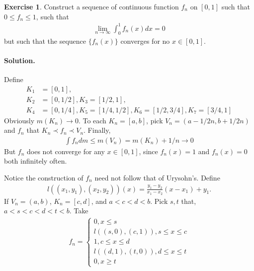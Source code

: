 \documentclass[10pt,a4paper]{book}
\theoremstyle{definition}
\newtheorem{exercise}{Exercise}[chapter]
\begin{document}
	\begin{exercise}
		Construct a sequence of continuous function $ f_n $ on $ [0, 1] $ such that $ 0 \le f_n \le 1 $, such that
		\begin{align*}
			\lim _{n \to \infty} \int_0^1 f_n(x) dx = 0
		\end{align*}
		but such that the sequence $ \{f_n(x)\} $ converges for no $ x \in [0, 1] $.

		\paragraph{Solution. }
		Define
		\begin{align*}
			K_1 &= [0, 1], \\
			K_2 &= [0, 1/2], K_3 = [1/2, 1], \\
			K_4 &= [0, 1/4], K_5 = [1/4, 1/2], K_6 = [1/2, 3/4], K_7 = [3/4, 1]
		\end{align*}
		Obviously $ m(K_n) \to 0 $. To each $ K_n = [a, b] $, pick $ V_n = (a - 1/2n, b + 1/2n) $ and $ f_n $ that $ K_n \prec f_n \prec V_n $. Finally,
		\begin{align*}
			\int f_n dm \le m(V_n) = m(K_n) + 1/n \to 0
		\end{align*}
		But $ f_n $ does not converge for any $ x \in [0, 1] $, since $ f_n(x) = 1 $ and $ f_n(x) = 0 $ both infinitely often.

		Notice the construction of $ f_n $ need not follow that of Urysohn's. Define
		\begin{align*}
			l((x_1, y_1), (x_2, y_2))(x) = \frac {y_1 - y_2}{x_1 - x_2} (x - x_1) + y_1.
		\end{align*}
		If $ V_n = (a, b) $, $ K_n = [c, d] $, and $ a < c < d < b $. Pick $ s, t $ that, $ a < s < c < d < t < b $. Take
		\begin{align*}
			f_n = \begin{cases}
				0, x \le s\\
				l((s, 0), (c, 1)), s \le x \le c\\
				1, c \le x \le d\\
				l((d, 1), (t, 0)), d \le x \le t\\
				0, x \ge t
		\end{cases}
		\end{align*}





	\end{exercise}
\end{document}
